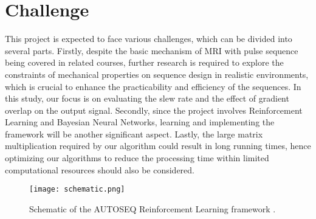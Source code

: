 \section{Challenge}
This project is expected to face various challenges, which can be divided into several parts. Firstly, despite the basic mechanism of MRI with pulse sequence being covered in related courses, further research is required to explore the constraints of mechanical properties on sequence design in realistic environments, which is crucial to enhance the practicability and efficiency of the sequences. In this study, our focus is on evaluating the slew rate and the effect of gradient overlap on the output signal. Secondly, since the project involves Reinforcement Learning and Bayesian Neural Networks, learning and implementing the framework will be another significant aspect. Lastly, the large matrix multiplication required by our algorithm could result in long running times, hence optimizing our algorithms to reduce the processing time within limited computational resources should also be considered.


\begin{figure}[ht]
    \centering
    \texttt{[image: schematic.png]}
    \caption{Schematic of the AUTOSEQ Reinforcement Learning framework \citep{0438}.}
    \label{schematic}
\end{figure}